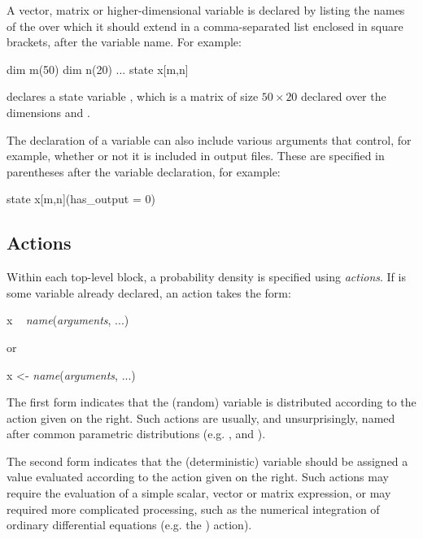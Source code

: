 A vector, matrix or
higher-dimensional variable is declared by listing
the names of the  over which it should extend
in a comma-separated list enclosed in square brackets, after the variable
name. For example:
\begin{bicode}
dim m(50)
dim n(20)
...
state x[m,n]
\end{bicode}
declares a state variable , which is a matrix of size
$50 \times 20$ declared over the dimensions  and .

The declaration of a variable can also include various arguments that control,
for example, whether or not it is included in output files. These are
specified in parentheses after the variable declaration, for example:
\begin{bicode}
state x[m,n](has_output = 0)
\end{bicode}

\subsection{Actions\label{Actions}}

Within each top-level block, a probability density is specified using
\emph{actions}. If  is some variable already declared, an action
takes the form:
\begin{bicode}
x ~ \textsl{name}(\textsl{arguments}, ...)
\end{bicode}
or
\begin{bicode}
x <- \textsl{name}(\textsl{arguments}, ...)
\end{bicode}

The first form indicates that the (random) variable  is distributed
according to the action given on the right. Such actions are usually, and
unsurprisingly, named after common parametric distributions (e.g.
,  and ).

The second form indicates that the (deterministic) variable  should be
assigned a value evaluated according to the action given on the right. Such
actions may require the evaluation of a simple scalar,
vector or matrix expression, or may required more
complicated processing, such as the numerical integration of ordinary
differential equations (e.g. the
) action).


